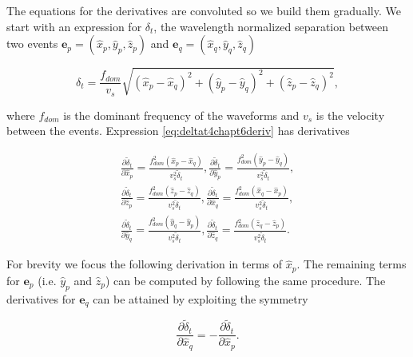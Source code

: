 \documentclass[12pt,double]{article}
\begin{document}
The equations for the derivatives are convoluted so we build them
gradually. We start with an expression for $\delta_t$, the
wavelength normalized separation between two events $\mathbf{e}_p=
(\hat{x}_p,\hat{y}_p,\hat{z}_p)$ and $\mathbf{e}_q =
(\hat{x}_q,\hat{y}_q,\hat{z}_q)$
\begin{linenomath*} \begin{equation}
\label{eq:deltat4chapt6deriv}
\delta_t = \frac{f_{dom}}{v_s}\sqrt{(\hat{x}_p-\hat{x}_q)^2 + (\hat{y}_p-\hat{y}_q)^2 +  (\hat{z}_p-\hat{z}_q)^2},
\end{equation} \end{linenomath*}
where $f_{dom}$ is the dominant frequency of the waveforms and $v_s$ is the velocity between the events. Expression
\ref{eq:deltat4chapt6deriv} has derivatives
\begin{linenomath*} \begin{equation}
\label{eq-partial-xyz1}
\begin{array}{l}
\frac{\partial \widetilde{\delta}_t}{\partial \hat{x}_p} = \frac{f_{dom}^2 (\hat{x}_p-\hat{x}_q)}{v_s^2 \widetilde{\delta}_t},
\frac{\partial \widetilde{\delta}_t}{\partial \hat{y}_p} = \frac{f_{dom}^2 (\hat{y}_p-\hat{y}_q)}{v_s^2 \widetilde{\delta}_t}, \\
\frac{\partial \widetilde{\delta}_t}{\partial \hat{z}_p} = \frac{f_{dom}^2 (\hat{z}_p-\hat{z}_q)}{v_s^2 \widetilde{\delta}_t},
\frac{\partial \widetilde{\delta}_t}{\partial \hat{x}_q} = \frac{f_{dom}^2 (\hat{x}_q-\hat{x}_p)}{v_s^2 \widetilde{\delta}_t}, \\
\frac{\partial \widetilde{\delta}_t}{\partial \hat{y}_q} = \frac{f_{dom}^2 (\hat{y}_q-\hat{y}_p)}{v_s^2 \widetilde{\delta}_t},
\frac{\partial \widetilde{\delta}_t}{\partial \hat{z}_q} = \frac{f_{dom}^2 (\hat{z}_q-\hat{z}_p)}{v_s^2 \widetilde{\delta}_t}.
\end{array}
\end{equation} \end{linenomath*}
For brevity we focus the following derivation in terms of $\hat{x}_p$. The remaining terms for $\mathbf{e}_p$
(i.e. $\hat{y}_p$ and $\hat{z}_p$) can be computed
by following the same procedure. The derivatives for $\mathbf{e}_q$ can be attained by exploiting the symmetry
\begin{linenomath*} \begin{equation}
\label{eq:ep2eq-deriv-symmetry}
\frac{\partial \widetilde{\delta}_t}{\partial \hat{x}_q} = - \frac{\partial \widetilde{\delta}_t}{\partial \hat{x}_p}.
\end{equation} \end{linenomath*}
\end{document}

